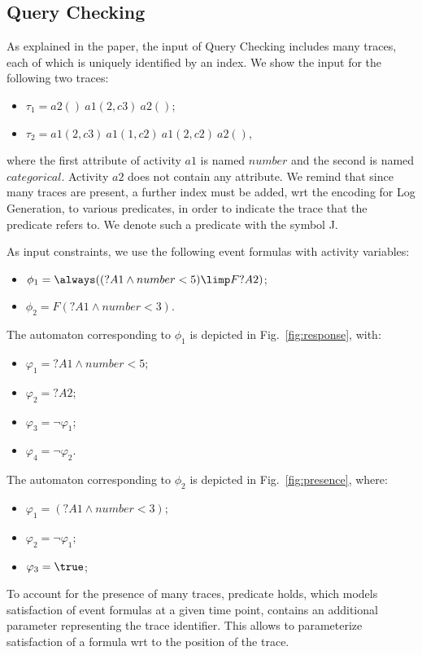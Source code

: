 \subsection{Query Checking}
As explained in the paper, the input of Query Checking 
includes many traces, each of which is uniquely identified by an index.
We show the input for the following two traces:
\begin{itemize}
	\item $\tau_1=a2()~a1(2,c3)~a2()$;
	\item $\tau_2=a1(2,c3)~a1(1,c2)~a1(2,c2)~a2()$,
\end{itemize}
where the first attribute of activity $a1$ is named $number$ and the 
second is named $categorical$. Activity $a2$ does not contain any attribute.
We remind that since many traces are present, a further index must be added,
wrt the encoding for Log Generation, to various predicates, in order 
to indicate the trace that the predicate refers to. We denote such a predicate 
with the symbol {\asp J}.

As input constraints, we use the following event formulas with 
activity variables:
\begin{itemize}
	\item $\phi_1=\always((?A1 \land number<5) \limp F ?A2)$;
	\item $\phi_2=F (?A1 \land number < 3)$.
\end{itemize}
The automaton corresponding to $\phi_1$ is depicted in Fig.~\ref{fig:response},
with: 
\begin{itemize}
	\item $\varphi_1=?A1 \land number<5$;
	\item $\varphi_2=?A2$;
	\item $\varphi_3=\lnot \varphi_1$;
	\item $\varphi_4=\lnot\varphi_2$.
\end{itemize}
The automaton corresponding to $\phi_2$ is depicted in Fig.~\ref{fig:presence},
where:
\begin{itemize}
	\item $\varphi_1=(?A1 \land number < 3)$;
	\item $\varphi_2=\lnot\varphi_1$;
	\item $\varphi_3=\true$;
\end{itemize}
To account for the presence of many traces, predicate 
{\asp holds}, which models satisfaction of event formulas at
a given time point, contains an additional parameter representing 
the trace identifier. This allows to parameterize satisfaction of a 
formula wrt to the position of the trace.

